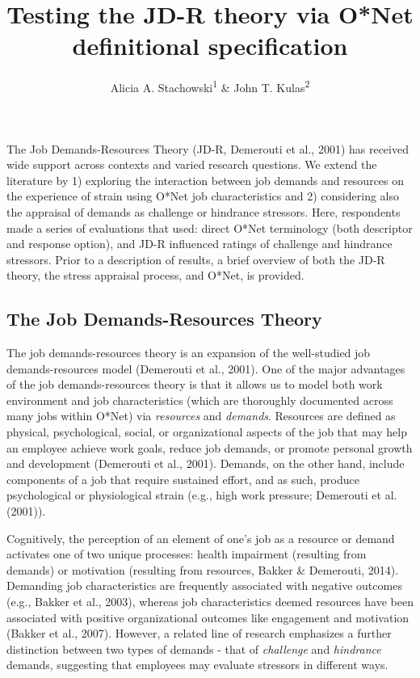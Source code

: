 \documentclass[
  man]{apa6}
\title{Testing the JD-R theory via O*Net definitional specification}
\author{Alicia A. Stachowski\textsuperscript{1} \& John T. Kulas\textsuperscript{2}}
\date{}
\affiliation{\vspace{0.5cm}\textsuperscript{1} University of Wisconsin - Stout\\\textsuperscript{2} eRg}
\begin{document}
\maketitle

The Job Demands-Resources Theory (JD-R, Demerouti et al., 2001) has received wide support across contexts and varied research questions. We extend the literature by 1) exploring the interaction between job demands and resources on the experience of strain using O*Net job characteristics and 2) considering also the appraisal of demands as challenge or hindrance stressors. Here, respondents made a series of evaluations that used: direct O*Net terminology (both descriptor and response option), and JD-R influenced ratings of challenge and hindrance stressors. Prior to a description of results, a brief overview of both the JD-R theory, the stress appraisal process, and O*Net, is provided.

\hypertarget{the-job-demands-resources-theory}{%
\subsection{The Job Demands-Resources Theory}\label{the-job-demands-resources-theory}}

The job demands-resources theory is an expansion of the well-studied job demands-resources model (Demerouti et al., 2001). One of the major advantages of the job demands-resources theory is that it allows us to model both work environment and job characteristics (which are thoroughly documented across many jobs within O*Net) via \emph{resources} and \emph{demands}. Resources are defined as physical, psychological, social, or organizational aspects of the job that may help an employee achieve work goals, reduce job demands, or promote personal growth and development (Demerouti et al., 2001). Demands, on the other hand, include components of a job that require sustained effort, and as such, produce psychological or physiological strain (e.g., high work pressure; Demerouti et al. (2001)).

Cognitively, the perception of an element of one's job as a resource or demand activates one of two unique processes: health impairment (resulting from demands) or motivation (resulting from resources, Bakker \& Demerouti, 2014). Demanding job characteristics are frequently associated with negative outcomes (e.g., Bakker et al., 2003), whereas job characteristics deemed resources have been associated with positive organizational outcomes like engagement and motivation (Bakker et al., 2007). However, a related line of research emphasizes a further distinction between two types of demands - that of \emph{challenge} and \emph{hindrance} demands, suggesting that employees may evaluate stressors in different ways.
\end{document}
